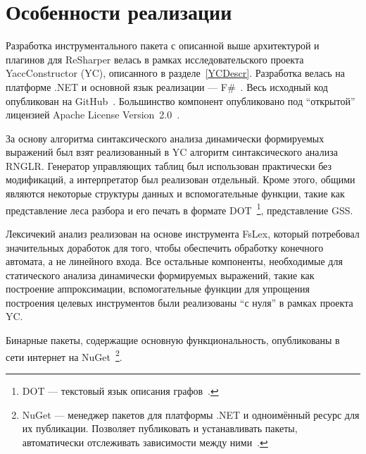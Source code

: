 \section{Особенности реализации}

Разработка инструментального пакета с описанной выше архитектурой и плагинов для ReSharper велась в рамках исследовательского проекта YaccConstructor (YC), описанного в разделе~\ref{YCDescr}. 
Разработка велась на платформе .NET и основной язык реализации --- F\#~\cite{FSharp}. Весь исходный код опубликован на GitHub~\cite{YCUrl}. 
Большинство компонент опубликовано под ``открытой'' лицензией Apache License Version~2.0~\cite{ApacheV2}. 

За основу алгоритма синтаксического анализа динамически формируемых выражений был взят реализованный в YC алгоритм синтаксического анализа RNGLR. Генератор управляющих таблиц был использован практически без 
модификаций, а интерпретатор был реализован отдельный. Кроме этого, общими являются некоторые структуры данных и вспомогательные функции, такие как представление леса разбора и его печать в формате 
DOT~\footnote{DOT --- текстовый язык описания графов~\cite{DOT}.}, представление GSS. 

Лексичекий анализ реализован на основе инструмента FsLex, который потребовал значительных доработок для того, чтобы обеспечить обработку конечного автомата, а не линейного входа. Все остальные компоненты, 
необходимые для статического анализа динамически формируемых выражений, такие как построение аппроксимации, вспомогательные функции для упрощения построения целевых инструментов были реализованы ``с нуля'' 
в рамках проекта YC.

Бинарные пакеты, содержащие основную функциональность, опубликованы в сети интернет на NuGet~\footnote{NuGet --- менеджер пакетов для платформы .NET и одноимённый ресурс для их публикации. Позволяет публиковать 
и устанавливать пакеты, автоматически отслеживать зависимости между ними~\cite{NuGet}.}.
